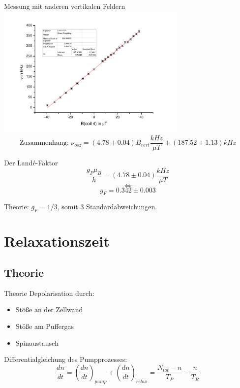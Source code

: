 \documentclass{beamer}
\begin{document}
\begin{frame}{Messung mit anderen vertikalen Feldern}
\centering \includegraphics[width=0.7\textwidth]{Bilder/praezfeld.pdf}
$$\text{Zusammenhang: } \nu_{osz} = (4.78\pm0.04)B_{vert} \frac{kHz}{\mu T} + (187.52 \pm 1.13)kHz$$
\end{frame}

\begin{frame}{Der Landé-Faktor}
$$\frac{g_F\mu_B}{h} = (4.78 \pm 0.04) \frac{kHz}{\mu T}$$
$$ \Leftrightarrow $$
$$ g_F = 0.342 \pm 0.003 $$

Theorie: $g_F = 1/3$, somit 3 Standardabweichungen.

\end{frame}

\section{Relaxationszeit}
\begin{frame}
\begin{center}
\end{center}
\end{frame}

\subsection{Theorie}
\begin{frame}{Theorie}
Depolarisation durch:
\begin{itemize}
\item Stöße an der Zellwand
\item Stöße am Puffergas
\item Spinaustausch
\end{itemize}

Differentialgleichung des Pumpprozesses:
 $$\frac{dn}{dt} = \left(\frac{dn}{dt}\right)_{pump} + \left(\frac{dn}{dt}\right)_{relax} = \frac{N_{tot}-n}{T_P} - \frac{n}{T_R}$$ %
\end{frame}
\end{document}
